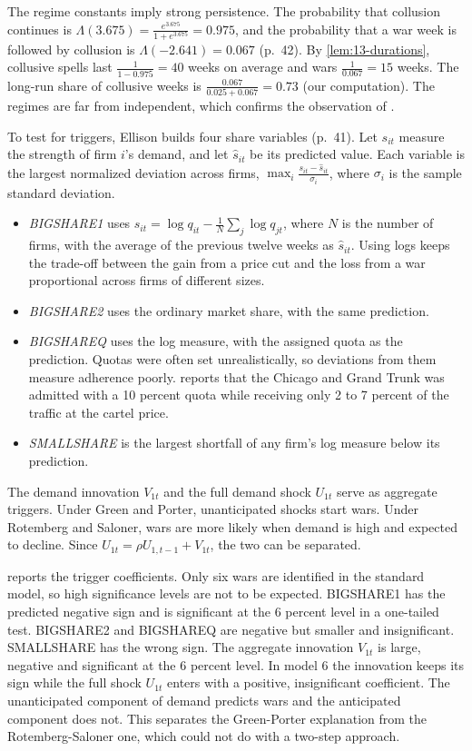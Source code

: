 The regime constants imply strong persistence. The probability that collusion continues is
$\Lambda(3.675) = \frac{e^{3.675}}{1 + e^{3.675}} = 0.975$, and the probability that a war week is followed by
collusion is $\Lambda(-2.641) = 0.067$ (p.~42). By \cref{lem:13-durations}, collusive spells last
$\frac{1}{1 - 0.975} = 40$ weeks on average and wars $\frac{1}{0.067} = 15$ weeks. The long-run share of collusive
weeks is $\frac{0.067}{0.025 + 0.067} = 0.73$ (our computation). The regimes are far from independent, which
confirms the observation of \citet{CosslettLee1985}.

To test for triggers, Ellison builds four share variables (p.~41). Let $s_{it}$ measure the strength of firm $i$'s
demand, and let $\hat s_{it}$ be its predicted value. Each variable is the largest normalized deviation across
firms, $\max_i \frac{s_{it} - \hat s_{it}}{\sigma_i}$, where $\sigma_i$ is the sample standard deviation.
\begin{itemize}
\item \textit{BIGSHARE1} uses $s_{it} = \log q_{it} - \frac{1}{N}\sum_j \log q_{jt}$, where $N$ is the number of
firms, with the average of the
previous twelve weeks as $\hat s_{it}$. Using logs keeps the trade-off between the gain from a price cut and the
loss from a war proportional across firms of different sizes.
\item \textit{BIGSHARE2} uses the ordinary market share, with the same prediction.
\item \textit{BIGSHAREQ} uses the log measure, with the assigned quota as the prediction. Quotas were often set
unrealistically, so deviations from them measure adherence poorly. \citet{MacAvoy1965} reports that the Chicago and
Grand Trunk was admitted with a 10 percent quota while receiving only 2 to 7 percent of the traffic at the cartel
price.
\item \textit{SMALLSHARE} is the largest shortfall of any firm's log measure below its prediction.
\end{itemize}
The demand innovation $V_{1t}$ and the full demand shock $U_{1t}$ serve as aggregate triggers. Under Green and
Porter, unanticipated shocks start wars. Under Rotemberg and Saloner, wars are more likely when demand is high and
expected to decline. Since $U_{1t} = \rho U_{1,t-1} + V_{1t}$, the two can be separated.

 reports the trigger coefficients. Only six wars are identified in the standard model, so
high significance levels are not to be expected. BIGSHARE1 has the predicted negative sign and is significant at the
6 percent level in a one-tailed test. BIGSHARE2 and BIGSHAREQ are negative but smaller and insignificant.
SMALLSHARE has the wrong sign. The aggregate innovation $V_{1t}$ is large, negative and significant at the 6 percent
level. In model 6 the innovation keeps its sign while the full shock $U_{1t}$ enters with a positive, insignificant
coefficient. The unanticipated component of demand predicts wars and the anticipated component does not. This
separates the Green-Porter explanation from the Rotemberg-Saloner one, which \citet{Porter1985} could not do with a
two-step approach.

